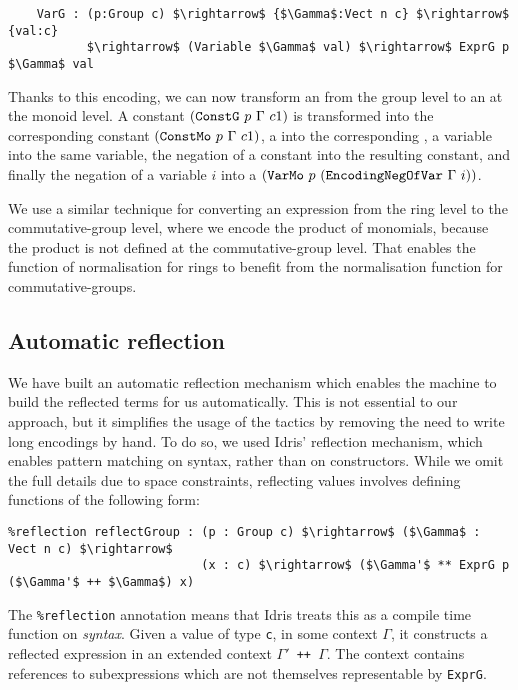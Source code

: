 \begin{lstlisting}
    VarG : (p:Group c) $\rightarrow$ {$\Gamma$:Vect n c} $\rightarrow$ {val:c} 
           $\rightarrow$ (Variable $\Gamma$ val) $\rightarrow$ ExprG p $\Gamma$ val
\end{lstlisting}


Thanks to this encoding, we can now transform an  from the group
level to an  at the monoid level. A constant $({\mbox{\texttt{ConstG}}}\ p\
\Gamma\ c1)$ is transformed into the corresponding constant
$({\mbox{\texttt{ConstMo}}}\ p\ \Gamma\ c1)$, a  into the corresponding
\code{PlusMo}, a variable into the same variable, the negation of a
constant into the resulting constant, and finally the negation of a variable
$i$ into a $(\code{VarMo}\ p\ (\code{EncodingNegOfVar}\ \Gamma\ i))$.

We use a similar technique for converting an expression from the ring level
to the commutative-group level, where we encode the product of monomials,
because the product is not defined at the commutative-group level.
That enables the function of normalisation for rings to benefit from the
normalisation function for commutative-groups.


\subsection{Automatic reflection}
		
We have built an automatic reflection mechanism which enables the machine to
build the reflected terms for us automatically. This is not essential to our
approach, but it simplifies the usage of the tactics by removing the need to
write long encodings by hand.  To do so, we used Idris' reflection mechanism,
which enables pattern matching on syntax, rather than on constructors. 
While we omit the full details due to space constraints, reflecting values
involves defining functions of the following form:

\begin{lstlisting}
%reflection reflectGroup : (p : Group c) $\rightarrow$ ($\Gamma$ : Vect n c) $\rightarrow$ 
                           (x : c) $\rightarrow$ ($\Gamma'$ ** ExprG p ($\Gamma'$ ++ $\Gamma$) x)
\end{lstlisting}

The \texttt{\%reflection} annotation means that Idris treats this as a 
compile time function on \emph{syntax}. Given a value of type
\texttt{c}, in some context $\Gamma$, it constructs a reflected expression 
in an extended context \texttt{$\Gamma'$ ++ $\Gamma$}. The context
contains references to subexpressions 
which are not themselves representable by \texttt{ExprG}.

